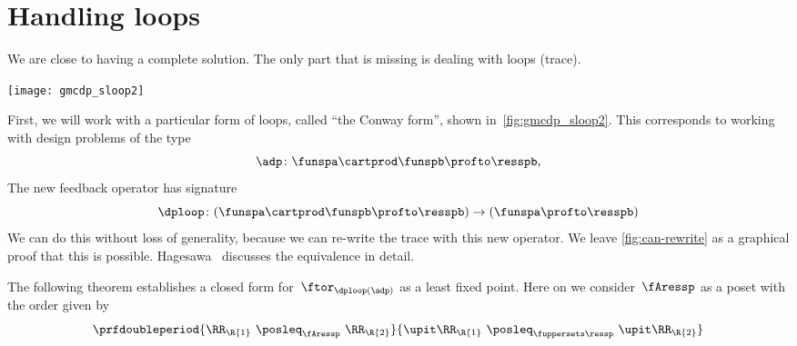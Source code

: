 \section{Handling loops}

We are close to having a complete solution.
The only part that is missing is dealing with loops (trace).

\begin{marginfigure}
    \texttt{[image: gmcdp\_sloop2]}
    \caption{}
    \label{fig:gmcdp_sloop2}
\end{marginfigure}

First, we will work with a particular form of loops, called ``the Conway form'',
shown in~\cref{fig:gmcdp_sloop2}.
This corresponds to working with design problems of the type
\begin{equation}
    \adp \colon \funspa \cartprod \funspb  \profto \resspb,
\end{equation}
The new feedback operator has signature
\begin{equation}
    \dploop\colon (\funspa \cartprod \funspb \profto \resspb) \to (\funspa \profto \resspb)
\end{equation}
%
We can do this without loss of generality, because we can re-write the trace
with this new operator.
We leave \cref{fig:can-rewrite} as a graphical proof that this is possible.
Hagesawa~\cite{hasegawa02uniformity} discusses the equivalence in detail.

\begin{figure*}[h]
    \hspace*{\fill}
    \hspace*{\fill}
    \hspace*{\fill}
    \caption{We can rewrite the trace in Conway's form.}
    \label{fig:can-rewrite}
\end{figure*}

The following theorem establishes a closed form for~$\ftor_{\dploop(\adp)}$ as a least fixed point.
Here on we consider~$\fAressp$ as a poset with the order given by
\begin{equation}
    \prfdoubleperiod{
        \RR_\R{1} \  \posleq_{\fAressp} \ \RR_\R{2}
    }{
        \upit \RR_\R{1} \ \posleq_{\fuppersets \ressp}\  \upit \RR_\R{2}
    }
\end{equation}

